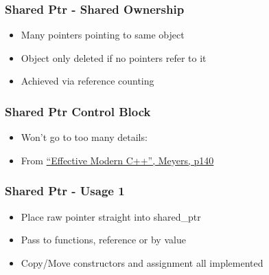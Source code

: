\begin{Shaded}
\begin{Highlighting}[]
 
   \NormalTok{,}\NormalTok{));}
\NormalTok{\}}

\end{Highlighting}
\end{Shaded}

\subsubsection{Shared Ptr - Shared
Ownership}\label{shared-ptr---shared-ownership}

\begin{itemize}
\itemsep1pt\parskip0pt
\item
  Many pointers pointing to same object
\item
  Object only deleted if no pointers refer to it
\item
  Achieved via reference counting
\end{itemize}

\subsubsection{Shared Ptr Control Block}\label{shared-ptr-control-block}

\begin{itemize}
\item
  Won't go to too many details: 
\item
  From
  \href{https://www.amazon.co.uk/Effective-Modern-Specific-Ways-Improve/dp/1491903996/ref=sr_1_1?ie=UTF8\&qid=1484571499\&sr=8-1\&keywords=Effective+Modern+C\%2B\%2B}{``Effective
  Modern C++'', Meyers, p140}
\end{itemize}

\subsubsection{Shared Ptr - Usage 1}\label{shared-ptr---usage-1}

\begin{itemize}
\itemsep1pt\parskip0pt
\item
  Place raw pointer straight into shared\_ptr
\item
  Pass to functions, reference or by value
\item
  Copy/Move constructors and assignment all implemented
\end{itemize}

